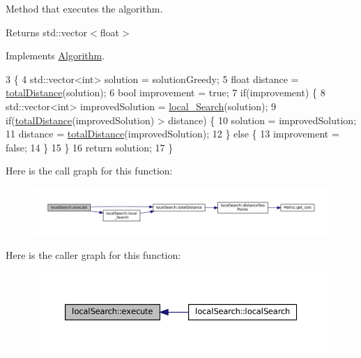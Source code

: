 Method that executes the algorithm. 

\begin{DoxyReturn}{Returns}
std\+::vector$<$float$>$ 
\end{DoxyReturn}


Implements \hyperlink{classAlgorithm_af6ea9eb9a6dbd41896e3fd7dabac096b}{Algorithm}.


\begin{DoxyCode}
3 \{
4   std::vector<int> solution = solutionGreedy;
5   \textcolor{keywordtype}{float} distance = \hyperlink{classlocalSearch_a0b14e5f24760de3ea567ff507d3a2ece}{totalDistance}(solution);
6   \textcolor{keywordtype}{bool} improvement = \textcolor{keyword}{true};
7   \textcolor{keywordflow}{if}(improvement) \{
8     std::vector<int> improvedSolution = \hyperlink{classlocalSearch_afe2b71349ac06285bdccaf85847650c0}{local\_Search}(solution);
9     \textcolor{keywordflow}{if}(\hyperlink{classlocalSearch_a0b14e5f24760de3ea567ff507d3a2ece}{totalDistance}(improvedSolution) > distance) \{
10       solution = improvedSolution;
11       distance = \hyperlink{classlocalSearch_a0b14e5f24760de3ea567ff507d3a2ece}{totalDistance}(improvedSolution);
12     \} \textcolor{keywordflow}{else} \{
13       improvement = \textcolor{keyword}{false};
14     \}
15   \}
16   \textcolor{keywordflow}{return} solution;
17 \}
\end{DoxyCode}
Here is the call graph for this function\+:
\nopagebreak
\begin{figure}[H]
\begin{center}
\leavevmode
\includegraphics[width=350pt]{classlocalSearch_a0ac1d7bf221f1ab7af92f1a91017cf02_cgraph}
\end{center}
\end{figure}
Here is the caller graph for this function\+:
\nopagebreak
\begin{figure}[H]
\begin{center}
\leavevmode
\includegraphics[width=350pt]{classlocalSearch_a0ac1d7bf221f1ab7af92f1a91017cf02_icgraph}
\end{center}
\end{figure}
\mbox{\label{classlocalSearch_afe2b71349ac06285bdccaf85847650c0}} 
